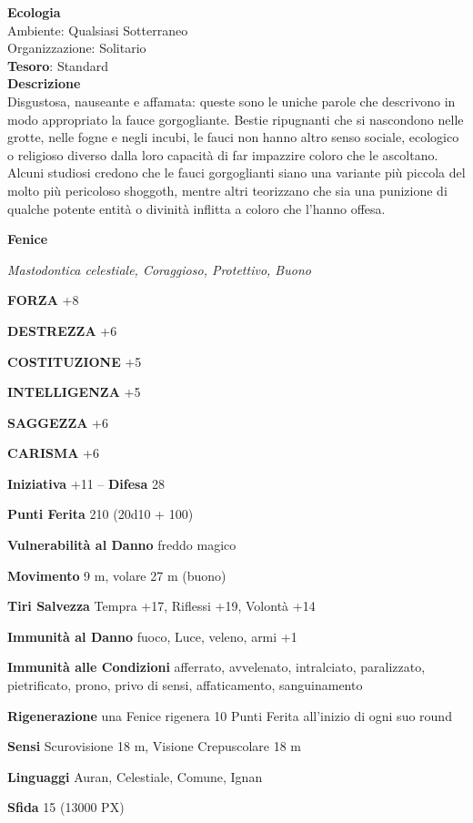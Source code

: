 \begin{multicols}{2}
	\textbf{Ecologia}\\
	Ambiente: Qualsiasi Sotterraneo\\
	Organizzazione: Solitario\\
	\textbf{Tesoro}: Standard\\
	\textbf{Descrizione}\\
	Disgustosa, nauseante e affamata: queste sono le uniche parole che descrivono in modo appropriato la fauce gorgogliante. Bestie ripugnanti che si nascondono nelle grotte, nelle fogne e negli incubi, le fauci non hanno altro senso sociale, ecologico o religioso diverso dalla loro capacità di far impazzire coloro che le ascoltano. Alcuni studiosi credono che le fauci gorgoglianti siano una variante più piccola del molto più pericoloso shoggoth, mentre altri teorizzano che sia una punizione di qualche potente entità o divinità inflitta a coloro che l'hanno offesa.

	\medskip{}\textbf{Fenice}

	\textit{Mastodontica celestiale, Coraggioso, Protettivo, Buono}

	\textbf{FORZA} +8

	\textbf{DESTREZZA} +6

	\textbf{COSTITUZIONE} +5

	\textbf{INTELLIGENZA} +5

	\textbf{SAGGEZZA} +6

	\textbf{CARISMA} +6

	\textbf{Iniziativa} +11 -- \textbf{Difesa} 28

	\textbf{Punti Ferita} 210 (20d10 + 100)

	\textbf{Vulnerabilità al Danno} freddo magico

	\textbf{Movimento} 9 m, volare 27 m (buono)

	\textbf{Tiri Salvezza} Tempra +17, Riflessi +19, Volontà +14

	\textbf{Immunità al Danno} fuoco, Luce, veleno, armi +1

	\textbf{Immunità alle Condizioni} afferrato, avvelenato, intralciato, paralizzato, pietrificato, prono, privo di sensi, affaticamento, sanguinamento

	\textbf{Rigenerazione} una Fenice rigenera 10 Punti Ferita all'inizio di ogni suo round

	\textbf{Sensi} Scurovisione 18 m, Visione Crepuscolare 18 m

	\textbf{Linguaggi} Auran, Celestiale, Comune, Ignan

	\textbf{Sfida} 15 (13000 PX)


\end{multicols}
